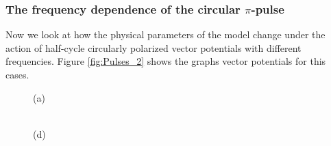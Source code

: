 \clearpage


\subsubsection{The frequency dependence of the circular $\pi$-pulse}

Now we look at how the physical parameters of the model change under the action of half-cycle circularly polarized vector potentials with different frequencies. Figure \ref{fig:Pulses_2} shows the graphs vector potentials for this cases. 


\begin{figure}[h!]
\begin{minipage}[h]{0.5\linewidth}
 (a) \\
\end{minipage}
\hfill
\begin{minipage}[h]{0.5\linewidth}
 \\(d)

\end{minipage}
\end{figure}

